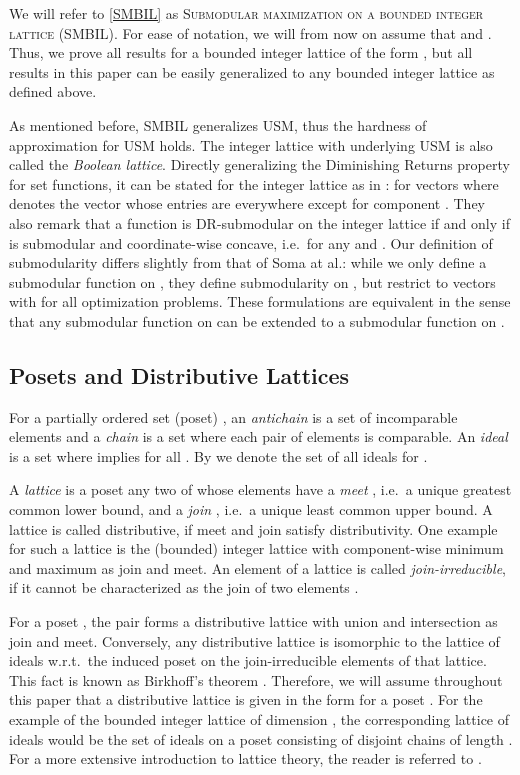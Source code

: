 \documentclass{article}
\theoremstyle{plain}
\theoremstyle{definition}
\begin{document}
We will refer to \eqref{SMBIL} as
\textsc{Submodular maximization on a bounded integer lattice (SMBIL)}.
For ease of notation, we will from now on assume that  and 
. 
Thus, we prove all results for a bounded integer lattice of the form , but 
all results in this paper can be easily generalized to any bounded integer lattice as defined above. 

As mentioned before, SMBIL generalizes USM, thus the hardness of approximation for USM holds.
The integer lattice with  underlying USM is also called the \emph{Boolean lattice}.
Directly generalizing the Diminishing Returns property for set functions, it can be stated for the integer lattice as in \cite{SomaYoshi16}: 
 for vectors  where  denotes the vector whose entries are  
everywhere except for component . 
They also remark that a function  is DR-submodular on the integer lattice  if and only if  is submodular and coordinate-wise concave, i.e.\
 for any  and  \cite{SomaYoshiSubmodularCover}.
Our definition of submodularity differs slightly from that of Soma at al.: while we only define a submodular function on , they define submodularity 
on , but restrict to vectors  with  for all optimization problems. These formulations are equivalent in the sense that 
any submodular function on  can be extended to a submodular function on . 




\subsection{Posets and Distributive Lattices}
For a partially ordered set (poset) , an \emph{antichain} 
is a set  of incomparable elements 
and a \emph{chain} is a set  where each pair of elements is comparable. 
An \emph{ideal} is a set  where  implies 
 for all . By  we denote the set of all ideals for . 

A \emph{lattice} is a poset  any two of whose elements  
have a \emph{meet} , i.e.\ a unique greatest common lower bound, and a \emph{join} , i.e.\ a unique least common upper bound. 
A lattice is called distributive, if meet and join satisfy distributivity. 
One example for such a lattice is the (bounded) integer lattice with component-wise minimum and maximum as join and meet.  
An element  of a lattice is called \emph{join-irreducible}, if it cannot be characterized as the join of two elements  .

For a poset ,  the pair  forms a distributive lattice with union and intersection as join and meet. 
Conversely, any distributive lattice is isomorphic to the lattice of ideals w.r.t.\
the induced poset on the join-irreducible elements of that lattice. This fact is known as Birkhoff's theorem \cite{Birkhoff}.
Therefore, we will assume throughout this paper that a distributive lattice is given in the form   for a poset . 
For the example of the bounded integer lattice of dimension , 
the corresponding lattice of ideals would be the set of ideals  on a poset  consisting of  disjoint chains of length . 
For a more extensive introduction to lattice theory, the reader is referred to \cite{Birkhoff}.
\end{document}

